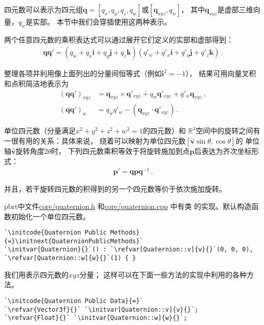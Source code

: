 四元数可以表示为四元组$\bm q=[q_x,q_y,q_z,q_w]$或$[\bm q_{xyz},q_w]$，
其中$\bm q_{xyz}$是虚部三维向量，$q_w$是实部。
本节中我们会穿插使用这两种表示。

两个任意四元数的乘积表达式可以通过展开它们定义的实部和虚部得到：
\begin{align*}
    \bm q\bm q'=(q_w+q_x\mathbf{i}+q_y\mathbf{j}+q_z\mathbf{k})(q'_w+q'_x\mathbf{i}+q'_y\mathbf{j}+q'_z\mathbf{k})\, .
\end{align*}

整理各项并利用像上面列出的分量间恒等式（例如$\mathbf{i}^2=-1$），
结果可用向量叉积和点积简洁地表示为
\begin{align}\label{eq:2.5}
    (\bm q\bm q')_{xyz} & =\bm q_{xyz}\times\bm q'_{xyz}+q_w\bm q'_{xyz}+q'_w\bm q_{xyz}\nonumber\, , \\
    (\bm q\bm q')_w     & =q_wq'_w-(\bm q_{xyz}\cdot\bm q'_{xyz})\, .
\end{align}

单位四元数（分量满足$x^2+y^2+z^2+w^2=1$的四元数）和
$\mathbb{R}^3$空间中的旋转之间有一很有用的关系：具体来说，
绕着可以映射为单位四元数$[\hat{\bm v}\sin\theta,\cos\theta]$的
单位轴$\hat{\bm v}$旋转角度$2\theta$时，
下列四元数乘积等效于将旋转施加到点$\bm p$后表达为齐次坐标形式：
\begin{align*}
    \bm p'=\bm q\bm p\bm q^{-1}\, .
\end{align*}

并且，若干旋转四元数的积得到的另一个四元数等价于依次施加旋转。

pbrt中文件\href{https://github.com/mmp/pbrt-v3/tree/master/src/core/quaternion.h}{{\ttfamily core/quaternion.h}}
和\href{https://github.com/mmp/pbrt-v3/tree/master/src/core/quaternion.cpp}{{\ttfamily core/quaternion.cpp}}
中有类
的实现。默认构造函数初始化一个单位四元数。
\begin{lstlisting}
`\initcode{Quaternion Public Methods}{=}\initnext{QuaternionPublicMethods}`
`\initvar{Quaternion}{}`() : `\refvar[Quaternion::v]{v}{}`(0, 0, 0), `\refvar[Quaternion::w]{w}{}`(1) { }
\end{lstlisting}

我们用表示四元数的$xyz$分量；
这样可以在下面一些方法的实现中利用的各种方法。
\begin{lstlisting}
`\initcode{Quaternion Public Data}{=}`
`\refvar{Vector3f}{}` `\initvar[Quaternion::v]{v}{}`;
`\refvar{Float}{}` `\initvar[Quaternion::w]{w}{}`;
\end{lstlisting}

